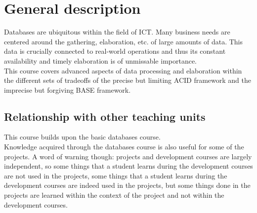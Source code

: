 \section{General description}
	Databases are ubiquitous within the field of ICT. Many business needs are centered around the gathering, elaboration, etc. of large amounts of data. This data is crucially connected to real-world operations and thus its constant availability and timely elaboration is of unmissable importance. \\
		
		This course covers advanced aspects of data processing and elaboration within the different sets of tradeoffs of the precise but limiting ACID framework and the imprecise but forgiving BASE framework. \\

	\subsection{Relationship with other teaching units}
		This course builds upon the basic databases course.	\\
		
		Knowledge acquired through the databases course is also useful for some of the projects. A word of warning though: projects and development courses are largely independent, so some things that a student learns during the development courses are not used in the projects, some things that a student learns during the development courses are indeed used in the projects, but some things done in the projects are learned within the context of the project and not within the development courses.
